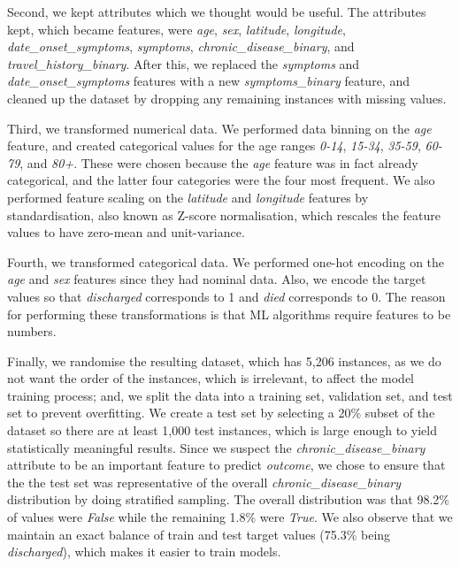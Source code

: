 \documentclass[twoside,11pt]{article}
\begin{document}
Second, we kept attributes which we thought would be useful. The attributes kept, which became features, were \emph{age}, \emph{sex}, \emph{latitude}, \emph{longitude}, \emph{date\_onset\_symptoms}, \emph{symptoms}, \emph{chronic\_disease\_binary}, and \emph{travel\_history\_binary}. After this, we replaced the \emph{symptoms} and \emph{date\_onset\_symptoms} features with a new \emph{symptoms\_binary} feature, and cleaned up the dataset by dropping any remaining instances with missing values. 

Third, we transformed numerical data. We performed data binning on the \emph{age} feature, and created categorical values for the age ranges \emph{0-14}, \emph{15-34}, \emph{35-59}, \emph{60-79}, and \emph{80+}. These were chosen because the \emph{age} feature was in fact already categorical, and the latter four categories were the four most frequent. We also performed feature scaling on the \emph{latitude} and \emph{longitude} features by standardisation, also known as Z-score normalisation, which rescales the feature values to have zero-mean and unit-variance.  

Fourth, we transformed categorical data. We performed one-hot encoding on the \emph{age} and \emph{sex} features since they had nominal data. Also, we encode the target values so that \emph{discharged} corresponds to 1 and \emph{died} corresponds to 0. The reason for performing these transformations is that ML algorithms require features to be numbers. 

Finally, we randomise the resulting dataset, which has 5,206 instances, as we do not want the order of the instances, which is irrelevant, to affect the model training process; and, we split the data into a training set, validation set, and test set to prevent overfitting. We create a test set by selecting a 20\% subset of the dataset so there are at least 1,000 test instances, which is large enough to yield statistically meaningful results. Since we suspect the \emph{chronic\_disease\_binary} attribute to be an important feature to predict \emph{outcome}, we chose to ensure that the the test set was representative of the overall \emph{chronic\_disease\_binary} distribution by doing stratified sampling. The overall distribution was that 98.2\% of values were \emph{False} while the remaining 1.8\% were \emph{True}. We also observe that we maintain an exact balance of train and test target values (75.3\% being \emph{discharged}), which makes it easier to train models.
\end{document}

